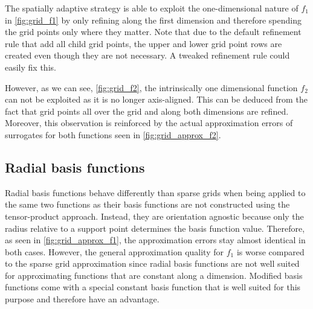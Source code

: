 \documentclass[
  a4paper,  %
  twoside,  %
  bibliography=totoc,
  headsepline,
  cleardoublepage=empty,
  parskip=half,
  draft=false
]{scrbook}
\begin{document}
The spatially adaptive strategy is able to exploit the one-dimensional nature of $f_1$ in \cref{fig:grid_f1} by only refining along the first dimension and therefore spending the grid points only where they matter.
Note that due to the default refinement rule that add all child grid points, the upper and lower grid point rows are created even though they are not necessary.
A tweaked refinement rule could easily fix this.

However, as we can see, \cref{fig:grid_f2}, the intrinsically one dimensional function $f_2$ can not be exploited as it is no longer axis-aligned.
This can be deduced from the fact that grid points all over the grid and along both dimensions are refined.
Moreover, this observation is reinforced by the actual approximation errors of surrogates for both functions seen in \cref{fig:grid_approx_f2}.

\subsection{Radial basis functions}

Radial basis functions behave differently than sparse grids when being applied to the same two functions as their basis functions are not constructed using the tensor-product approach.
Instead, they are orientation agnostic because only the radius relative to a support point determines the basis function value.
Therefore, as seen in \cref{fig:grid_approx_f1}, the approximation errors stay almost identical in both cases.
However, the general approximation quality for $f_1$ is worse compared to the sparse grid approximation since radial basis functions are not well suited for approximating functions that are constant along a dimension.
Modified basis functions come with a special constant basis function that is well suited for this purpose and therefore have an advantage.
\end{document}
